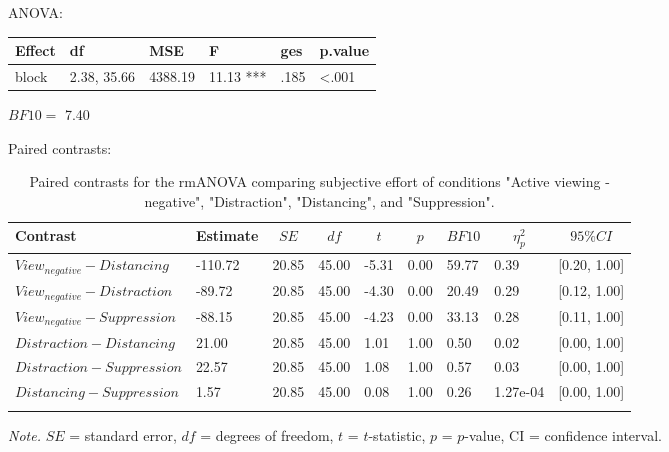 \documentclass[
  english,
  man,floatsintext]{apa6}
\begin{document}
ANOVA:

\begin{tabular}{l|l|l|l|l|l}
\hline
Effect & df & MSE & F & ges & p.value\\
\hline
block & 2.38, 35.66 & 4388.19 & 11.13 *** & .185 & <.001\\
\hline
\end{tabular}

\(BF10=\) 7.40

Paired contrasts:

\begin{table}[H]

\begin{center}
\begin{threeparttable}

\caption{\label{tab:unnamed-chunk-9}Paired contrasts for the rmANOVA comparing subjective effort of conditions "Active viewing - negative", "Distraction", "Distancing", and "Suppression".}

\begin{tabular}{lllllllll}
\toprule
Contrast & \multicolumn{1}{c}{Estimate} & \multicolumn{1}{c}{$SE$} & \multicolumn{1}{c}{$df$} & \multicolumn{1}{c}{$t$} & \multicolumn{1}{c}{$p$} & \multicolumn{1}{c}{$BF10$} & \multicolumn{1}{c}{$\eta_{p}^{2}$} & \multicolumn{1}{c}{$95\% CI$}\\
\midrule
$View_{negative} - Distancing$ & -110.72 & 20.85 & 45.00 & -5.31 & 0.00 & 59.77 & 0.39 & {}[0.20, 1.00]\\
$View_{negative} - Distraction$ & -89.72 & 20.85 & 45.00 & -4.30 & 0.00 & 20.49 & 0.29 & {}[0.12, 1.00]\\
$View_{negative} - Suppression$ & -88.15 & 20.85 & 45.00 & -4.23 & 0.00 & 33.13 & 0.28 & {}[0.11, 1.00]\\
$Distraction - Distancing$ & 21.00 & 20.85 & 45.00 & 1.01 & 1.00 & 0.50 & 0.02 & {}[0.00, 1.00]\\
$Distraction - Suppression$ & 22.57 & 20.85 & 45.00 & 1.08 & 1.00 & 0.57 & 0.03 & {}[0.00, 1.00]\\
$Distancing - Suppression$ & 1.57 & 20.85 & 45.00 & 0.08 & 1.00 & 0.26 & 1.27e-04 & {}[0.00, 1.00]\\
\bottomrule
\addlinespace
\end{tabular}

\begin{tablenotes}[para]
\normalsize{\textit{Note.} $SE$ = standard error, $df$ = degrees of freedom, $t$ = $t$-statistic, $p$ = $p$-value, CI = confidence interval.}
\end{tablenotes}

\end{threeparttable}
\end{center}

\end{table}
\end{document}
